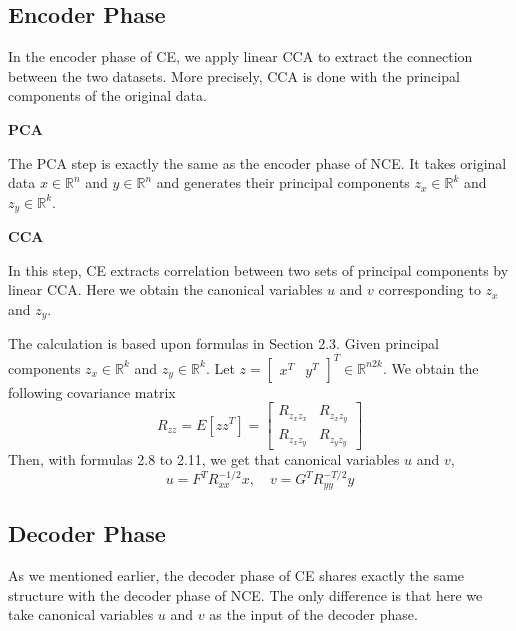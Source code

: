 \documentclass[12pt]{report} %
\begin{document}
\subsection{Encoder Phase}
In the encoder phase of CE, we apply linear CCA to extract the connection between the two datasets. More precisely, CCA is done with the principal components of the original data.

\textbf{PCA}

The PCA step is exactly the same as the encoder phase of NCE. It takes original data $x\in \mathbb{R}^{n}$ and $y\in \mathbb{R}^{n}$ and generates their principal components $z_x\in \mathbb{R}^{k}$ and $z_y\in \mathbb{R}^{k}$.

\textbf{CCA}

In this step, CE extracts correlation between two sets of principal components by linear CCA. Here we obtain the canonical variables $u$ and $v$ corresponding to $z_x$ and $z_y$. 

The calculation is based upon formulas in Section 2.3. Given principal components $z_x\in \mathbb{R}^{k}$ and $z_y\in \mathbb{R}^{k}$. Let $z= \begin{bmatrix}x^T & y^T\end{bmatrix}^T \in \mathbb{R}^{n2k}$. We obtain the following covariance matrix
\begin{equation}
R_{zz}=E[zz^T]=\begin{bmatrix}
R_{z_{x}z_{x}} & R_{z_{x}z_{y}} \\
R_{z_{x}z_{y}} & R_{z_{y}z_{y}}
\end{bmatrix}
\end{equation}
Then, with formulas 2.8 to 2.11, we get that canonical variables $u$ and $v$,
\begin{equation}
u=F^TR_{xx}^{-1/2}x,\quad v=G^TR_{yy}^{-T/2}y
\end{equation}

\subsection{Decoder Phase}
As we mentioned earlier, the decoder phase of CE shares exactly the same structure with the decoder phase of NCE. The only difference is that here we take canonical variables $u$ and $v$ as the input of the decoder phase. 
\end{document}
